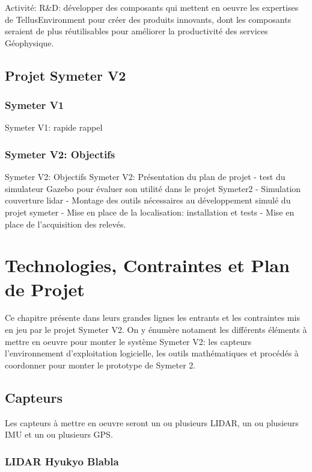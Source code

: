 \documentclass[12pt,a4paper]{report}
\begin{document}
	Activité: R\&D: développer des composants qui mettent en oeuvre les expertises de TellusEnvironment pour créer des produits innovants, dont les composants seraient de plus réutilisables pour améliorer la productivité des services Géophysique.


	\section{Projet Symeter V2}
		\subsection{Symeter V1}
		Symeter V1: rapide rappel
		
		\subsection{Symeter V2: Objectifs}
		Symeter V2: Objectifs
		Symeter V2: Présentation du plan de projet
- test du simulateur Gazebo pour évaluer son utilité dans le projet Symeter2
- Simulation couverture lidar
- Montage des outils nécessaires au développement simulé du projet symeter
- Mise en place de la localisation: installation et tests
- Mise en place de l'acquisition des relevés.

\chapter{Technologies, Contraintes et Plan de Projet}
	Ce chapitre présente dans leurs grandes lignes les entrants et les contraintes mis en jeu par le projet Symeter V2. On y énumère notament les différents éléments à mettre en oeuvre pour monter le système Symeter V2: les capteurs l'environnement d'exploitation logicielle, les outils mathématiques et procédés à coordonner pour monter le prototype de Symeter 2.
	
	\section{Capteurs}
		Les capteurs à mettre en oeuvre seront un ou plusieurs LIDAR, un ou plusieurs IMU et un ou plusieurs GPS.
		\subsection{LIDAR Hyukyo Blabla}
		
\end{document}
